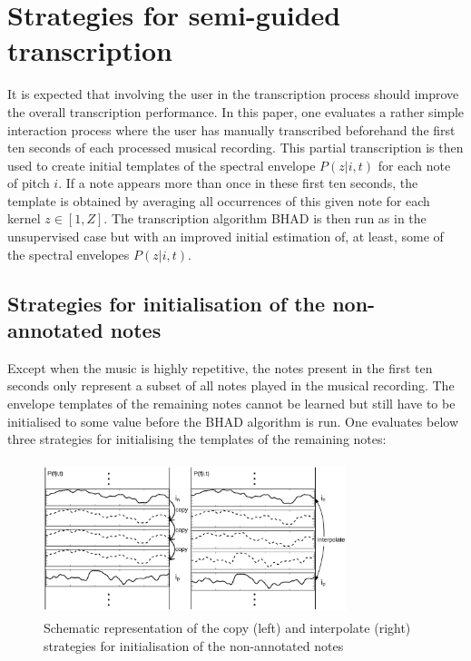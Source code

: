 \documentclass{article}
\begin{document}
\section{Strategies for semi-guided transcription}
\label{sec:semiguided}

It is expected that involving the user in the transcription process should improve the overall transcription performance. In this paper, one evaluates a rather simple interaction process where the user has manually transcribed beforehand the first ten seconds of each processed musical recording. This partial transcription is then used to create initial templates of the spectral envelope $P(z|i,t)$ for each note of pitch $i$. If a note appears more than once in these first ten seconds, the template is obtained by averaging all occurrences of this given note for each kernel $z \in \left[1,Z\right]$. The transcription algorithm BHAD is then run as in the unsupervised case but with an improved initial estimation of, at least, some of the spectral envelopes $P(z|i,t)$.

\subsection{Strategies for initialisation of the non-annotated notes}

Except when the music is highly repetitive, the notes present in the first ten seconds only represent a subset of all notes played in the musical recording. The envelope templates of the remaining notes cannot be learned but still have to be initialised to some value before the BHAD algorithm is run. One evaluates below three strategies for initialising the templates of the remaining notes:

\begin{figure}[!ht]
\begin{minipage}[b]{1.0\linewidth}
  \centering
  \centerline{\hspace{0.4cm} \includegraphics[width=8.8cm,height=4.5cm]{figures/copyinterpolate.png}}

\end{minipage}
\caption{Schematic representation of the copy (left) and interpolate (right) strategies for initialisation of the non-annotated notes}
\label{fig:copy}
\end{figure}
\end{document}
